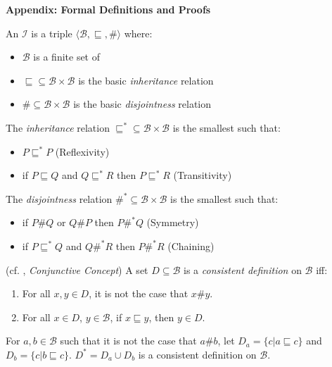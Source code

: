 \begin{center}
\Large \textbf{Appendix: Formal Definitions and Proofs} \\[1ex]
\end{center} 

 An  $\mathcal{I}$ is a triple $\langle\mathcal{B},\sqsubseteq,\#\rangle$ where:
\begin{itemize}
\item $\mathcal{B}$ is a finite set of 
\item $\sqsubseteq\subseteq\mathcal{B}\times\mathcal{B}$ is the basic \emph{inheritance} relation
\item $\#\subseteq\mathcal{B}\times\mathcal{B}$ is the basic \emph{disjointness} relation
\end{itemize}
\par\vspace{5mm}
 The \emph{inheritance} relation $\sqsubseteq^*\subseteq\mathcal{B}\times\mathcal{B}$ is the smallest such that:
\begin{itemize}
\item $P\sqsubseteq^*P$  (Reflexivity)
\item if $P\sqsubseteq Q$ and $Q\sqsubseteq^*R$ then $P\sqsubseteq^*R$ (Transitivity)
\end{itemize}
The \emph{disjointness} relation $\#^*\subseteq\mathcal{B}\times\mathcal{B}$ is the smallest such that:
\begin{itemize}
\item if $P\#Q$ or $Q\#P$ then $P\#^*Q$ (Symmetry)
\item if $P\sqsubseteq^*Q$ and $Q\#^*R$ then $P\#^*R$ (Chaining)
\end{itemize}
\par\vspace{5mm}
(cf. \cite{carpenter_inclusion_1991}, \emph{Conjunctive Concept}) A set $D\subseteq\mathcal{B}$ is a \emph{consistent definition} on $\mathcal{B}$ iff:
\begin{enumerate}
\item For all $x,y\in D$, it is not the case that $x\#y$.
\item For all $x\in D$, $y\in\mathcal{B}$, if $x\sqsubseteq y$, then $y\in D$.
\end{enumerate}
\par\vspace{3mm}
 For $a,b\in\mathcal{B}$ such that it is not the case that $a\#b$, let $D_a=\{c\vert a\sqsubseteq c\}$ and $D_b=\{c\vert b\sqsubseteq c\}$. $D^*=D_a\cup D_b$ is a consistent definition on $\mathcal{B}$.

